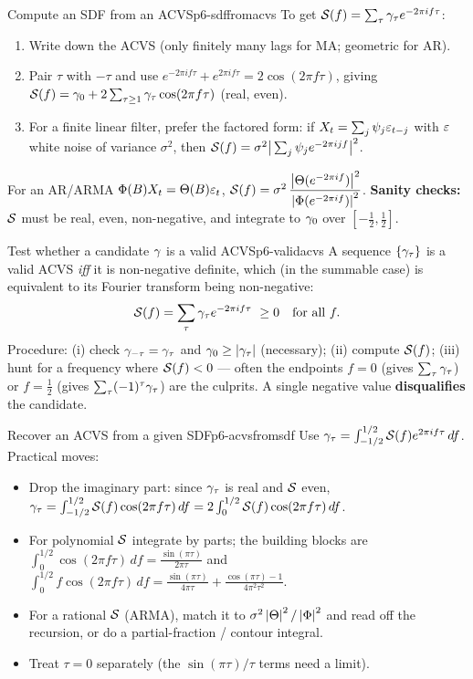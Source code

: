 \begin{keytech}{Compute an SDF from an ACVS}{p6-sdffromacvs}
To get $\mathcal{S}(f)=\sum_\tau\gamma_\tau e^{-2\pi i f\tau}$:
\begin{enumerate}
  \item Write down the ACVS (only finitely many lags for MA; geometric for AR).
  \item Pair $\tau$ with $-\tau$ and use
        $e^{-2\pi i f\tau}+e^{2\pi i f\tau}=2\cos(2\pi f\tau)$, giving
        $\mathcal{S}(f)=\gamma_0+2\sum_{\tau\ge1}\gamma_\tau\cos(2\pi f\tau)$ (real,
        even).
  \item For a finite linear filter, prefer the factored form: if
        $X_t=\sum_j\psi_j\varepsilon_{t-j}$ with $\varepsilon$ white noise of variance
        $\sigma^2$, then
        $\mathcal{S}(f)=\sigma^2\big|\sum_j\psi_j e^{-2\pi i j f}\big|^2$.
\end{enumerate}
For an AR/ARMA $\Phi(B)X_t=\Theta(B)\varepsilon_t$,
$\mathcal{S}(f)=\sigma^2\,\dfrac{\left\lvert \Theta(e^{-2\pi i f}) \right\rvert^2}{\left\lvert \Phi(e^{-2\pi i f}) \right\rvert^2}$.
\textbf{Sanity checks:} $\mathcal{S}$ must be real, even, non-negative, and integrate
to $\gamma_0$ over $[-\tfrac12,\tfrac12]$.
\end{keytech}

\begin{keytech}{Test whether a candidate $\gamma$ is a valid ACVS}{p6-validacvs}
A sequence $\{\gamma_\tau\}$ is a valid ACVS \emph{iff} it is non-negative
definite, which (in the summable case) is equivalent to its Fourier transform
being non-negative:
\[
\sdf(f)=\sum_\tau\acvs_\tau e^{-2\pi i f\tau}\ \ge 0\quad\text{for all }f .
\]
Procedure: (i) check $\gamma_{-\tau}=\gamma_\tau$ and $\gamma_0\ge\left\lvert \gamma_\tau \right\rvert$
(necessary); (ii) compute $\mathcal{S}(f)$; (iii) hunt for a frequency where
$\mathcal{S}(f)<0$ --- often the endpoints $f=0$ (gives $\sum_\tau\gamma_\tau$) or
$f=\tfrac12$ (gives $\sum_\tau(-1)^\tau\gamma_\tau$) are the culprits. A single
negative value \textbf{disqualifies} the candidate.
\end{keytech}

\begin{keytech}{Recover an ACVS from a given SDF}{p6-acvsfromsdf}
Use $\gamma_\tau=\int_{-1/2}^{1/2}\mathcal{S}(f)e^{2\pi i f\tau}\,df$. Practical moves:
\begin{itemize}
  \item Drop the imaginary part: since $\gamma_\tau$ is real and $\mathcal{S}$ even,
        $\gamma_\tau=\int_{-1/2}^{1/2}\mathcal{S}(f)\cos(2\pi f\tau)\,df
        =2\int_0^{1/2}\mathcal{S}(f)\cos(2\pi f\tau)\,df$.
  \item For polynomial $\mathcal{S}$ integrate by parts; the building blocks are
        $\int_0^{1/2}\cos(2\pi f\tau)\,df=\frac{\sin(\pi\tau)}{2\pi\tau}$ and
        $\int_0^{1/2}f\cos(2\pi f\tau)\,df
        =\frac{\sin(\pi\tau)}{4\pi\tau}+\frac{\cos(\pi\tau)-1}{4\pi^2\tau^2}$.
  \item For a rational $\mathcal{S}$ (ARMA), match it to
        $\sigma^2\left\lvert \Theta \right\rvert^2/\left\lvert \Phi \right\rvert^2$ and read off the recursion, or do
        a partial-fraction / contour integral.
  \item Treat $\tau=0$ separately (the $\sin(\pi\tau)/\tau$ terms need a limit).
\end{itemize}
\end{keytech}


